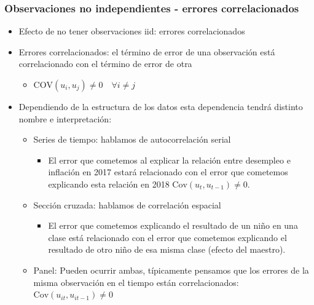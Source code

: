 \documentclass{beamer}
\begin{document}
\begin{frame}[shrink=10]
\frametitle{Observaciones no independientes - errores correlacionados}

\begin{itemize}
  \item Efecto de no tener observaciones iid: errores correlacionados
  \item Errores correlacionados: el término de error de una observación está correlacionado con el término de error de otra
  \begin{itemize}
    \item \( \text{COV}(u_i, u_j) \neq 0 \quad \forall i \neq j \)
  \end{itemize}
  \item Dependiendo de la estructura de los datos esta dependencia tendrá distinto nombre e interpretación:
  \begin{itemize}
    \item Series de tiempo: hablamos de autocorrelación serial
    \begin{itemize}
      \item El error que cometemos al explicar la relación entre desempleo e inflación en 2017 estará relacionado con el error que cometemos explicando esta relación en 2018 \( \text{Cov}(u_t, u_{t-1}) \neq 0 \).
    \end{itemize}
    \item Sección cruzada: hablamos de correlación espacial
    \begin{itemize}
      \item El error que cometemos explicando el resultado de un niño en una clase está relacionado con el error que cometemos explicando el resultado de otro niño de esa misma clase (efecto del maestro).
    \end{itemize}
    \item Panel: Pueden ocurrir ambas, típicamente pensamos que los errores de la misma observación en el tiempo están correlacionados: \( \text{Cov}(u_{it}, u_{it-1}) \neq 0 \)
    \end{itemize}
  \end{itemize}

\end{frame}
\end{document}
